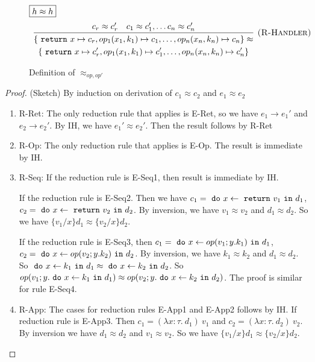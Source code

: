 \begin{theorem}
\begin{figure}[H]
{$\fbox{$h \approx h$}$
\[
\begin{array}{c}
\infer[\textsc{(R-Handler)}]{\begin{gathered} \{\m{return} x \mapsto c_r, op_1(x_1, k_1) \mapsto c_1, \dots, op_n(x_n, k_n) \mapsto c_n\} \approx \\\{\m{return} x \mapsto c_r', op_1(x_1, k_1) \mapsto c_1', \dots, op_n(x_n, k_n) \mapsto c_n'\}  
 \end{gathered} }{ c_r \approx c_r' & c_1 \approx c_1', \dots c_n \approx c_n'} 
\end{array}
\]


}
\caption{Definition of $\approx_{op, op'}$}
\end{figure}




\begin{proof}(Sketch) By induction on derivation of $c_1 \approx c_2$ and $e_1 \approx e_2$
\begin{enumerate}
\item R-Ret:
  The only reduction rule that applies is E-Ret, so we have $e_1 \longrightarrow e_1'$ and $e_2 \longrightarrow e_2'$. By IH, we have $e_1' \approx e_2'$. Then the result follows by R-Ret
\item R-Op: The only reduction rule that applies is E-Op. The result is immediate by IH.
\item R-Seq: If the reduction rule is E-Seq1, then result is immediate by IH. 

If the reduction rule is E-Seq2. Then we have $c_1 = \ \texttt{do}\  x \leftarrow \ \texttt{return}\  v_1 \ \texttt{in}\  d_1$, $c_2 = \ \texttt{do}\  x \leftarrow \ \texttt{return}\  v_2 \ \texttt{in}\  d_2$. By inversion, we have $v_1 \approx v_2$ and $d_1 \approx d_2$. So we have $\{v_1/x\}d_1 \approx \{v_2/x\}d_2$.

If the reduction rule is E-Seq3, then $c_1 = \ \texttt{do}\  x \leftarrow op(v_1; y. k_1) \ \texttt{in}\  d_1$, $c_2= \ \texttt{do}\  x \leftarrow op(v_2; y. k_2) \ \texttt{in}\  d_2$. By inversion, we have $k_1 \approx k_2$ and $d_1 \approx d_2$. So $\ \texttt{do}\  x \leftarrow k_1 \ \texttt{in}\  d_1 \approx \ \texttt{do}\  x \leftarrow k_2 \ \texttt{in}\  d_2$. So $op(v_1; y. \ \texttt{do}\  x \leftarrow k_1 \ \texttt{in}\  d_1) \approx op(v_2; y. \ \texttt{do}\  x \leftarrow k_2 \ \texttt{in}\  d_2)$. The proof is similar for rule E-Seq4.

\item R-App: The cases for reduction rules E-App1 and E-App2 follows by IH. If reduction rule is E-App3. Then $c_1 = (\lambda x:\tau.\ d_1)\ v_1$ and $c_2 = (\lambda x:\tau.\ d_2)\ v_2$. By inversion we have $d_1 \approx d_2$ and $v_1 \approx v_2$. So we have $\{v_1/x\}d_1 \approx \{v_2/x\}d_2$.


\end{enumerate}
\end{proof}
\end{theorem}
